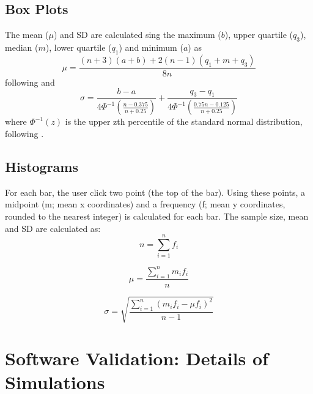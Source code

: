 \documentclass[12pt]{article}
\begin{document}
\subsection{Box Plots} 
The mean ($\mu$) and SD are calculated sing the maximum ($b$), upper quartile ($q_3$), median ($m$), lower quartile ($q_1$) and minimum ($a$) as 
\begin{equation}
\mu = \frac{(n+3)(a+b) + 2(n-1)(q_1 + m + q_3)}{8n}
\end{equation}
following \citet{Bland2015} and
\begin{equation}
\sigma = \frac{b-a}{4\Phi^{-1}(\frac{n-0.375}{n+0.25})} + \frac{q_3-q_1}{4\Phi^{-1}(\frac{0.75n-0.125}{n+0.25})}
\end{equation}
where $\Phi^{-1}(z)$ is the upper zth percentile of the standard normal distribution, following \citet{Wan2014}. 

\subsection{Histograms} 
For each bar, the user click two point (the top of the bar). Using these points, a midpoint (m; mean x coordinates) and a frequency (f; mean y coordinates, rounded to the nearest integer) is calculated for each bar. The sample size, mean and SD are calculated as:
\begin{equation}
n = \sum_{i=1}^n{f_i}
\end{equation}

\begin{equation}
\mu = \frac{\sum_{i=1}^n{m_i f_i}}{n}
\end{equation}

\begin{equation}
\sigma = \sqrt{\frac{\sum_{i=1}^n{(m_i f_i - \mu f_i)^2}}{n-1}}
\end{equation}


\clearpage

\section{Software Validation: Details of Simulations}
\end{document}
